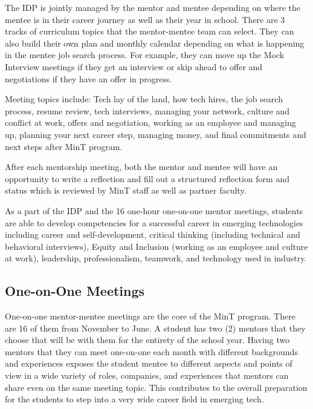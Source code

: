 The IDP is jointly managed by the mentor and mentee depending on where the mentee is in their career journey as well as their year in school. There are 3 tracks of curriculum topics that the mentor-mentee team can select. They can also build their own plan and monthly calendar depending on what is happening in the mentee job search process. For example, they can move up the Mock Interview meetings if they get an interview or skip ahead to offer and negotiations if they have an offer in progress.

Meeting topics include: Tech lay of the land, how tech hires, the job search process, resume review, tech interviews, managing your network, culture and conflict at work, offers and negotiation, working as an employee and managing up, planning your next career step, managing money, and final commitments and next steps after MinT program.

After each mentorship meeting, both the mentor and mentee will have an opportunity to write a reflection and fill out a structured reflection form and status which is reviewed by MinT staff as well as partner faculty.

As a part of the IDP and the 16 one-hour one-on-one mentor meetings, students are able to develop competencies for a successful career in emerging technologies including career and self-development, critical thinking (including technical and behavioral interviews), Equity and Inclusion (working as an employee and culture at work), leadership, professionalism, teamwork, and technology used in industry.

\subsection{One-on-One Meetings}

One-on-one mentor-mentee meetings are the core of the MinT program. There are 16 of them from November to June. A student has two (2) mentors that they choose that will be with them for the entirety of the school year. Having two mentors that they can meet one-on-one each month with different backgrounds and experiences exposes the student mentee to different aspects and points of view in a wide variety of roles, companies, and experiences that mentors can share even on the same meeting topic. This contributes to the overall preparation for the students to step into a very wide career field in emerging tech.
